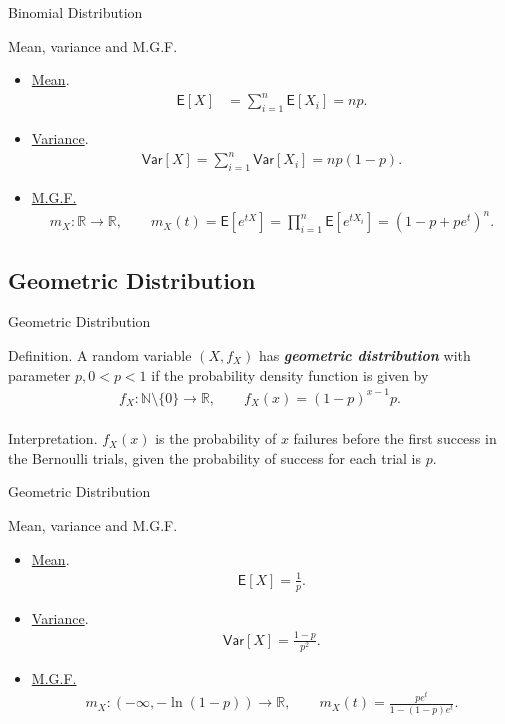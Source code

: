\documentclass[hyperref={pdfpagelabels=false}]{beamer}
\newcommand{\R}{\mathbb{R}}
\newcommand{\N}{\mathbb{N}}
\newcommand{\U}{\mathsf}
\newcommand{\highlightg}[1]{\textcolor[rgb]{0.1,0.5,0.3}{\emph{\textbf{#1}}}}
\newcommand{\structb}[1]{\textcolor[rgb]{0.2,0.2,0.7}{#1}}
\begin{document}
\begin{frame}{Binomial Distribution}

\justifying
\structb{Mean, variance and M.G.F.} 
\begin{itemize}
	\justifying
	\item \underline{Mean}.
	\begin{align*}
	\U{E}[X] & = \sum_{i=1}^n \U{E}[X_i] = np.
	\end{align*}
	\item \underline{Variance}. 
	\begin{align*}
	\U{Var}[X] = \sum_{i=1}^n\U{Var}[X_i] = np(1-p).
	\end{align*}
	\item \underline{M.G.F.}
	\begin{align*}
	m_X: \R\rightarrow\R, \qquad m_X(t) = \U{E}[e^{tX}] = \prod_{i=1}^n\U{E}[e^{tX_i}] = (1 - p + pe^t)^n.
	\end{align*}
\end{itemize}

\end{frame}

\subsection{Geometric Distribution}

\begin{frame}{Geometric Distribution}

\justifying
\structb{Definition.} A random variable $(X, f_X)$ has \highlightg{geometric distribution} with parameter $p, 0 < p < 1$ if the probability density function is given by
\begin{align*}
f_X: \N\setminus \{0\} \rightarrow \R, \qquad f_X(x) = (1-p)^{x-1} p.
\end{align*}
~\\
\structb{Interpretation.} $f_X(x)$ is the probability of $x$ failures before the first success in the Bernoulli trials, given the probability of success for each trial is $p$.

\end{frame}

\begin{frame}{Geometric Distribution}

\justifying
\structb{Mean, variance and M.G.F.} 
\begin{itemize}
	\justifying
	\item \underline{Mean}.
	\begin{align*}
	\U{E}[X] = \frac{1}{p}.
	\end{align*}
	\item \underline{Variance}.
	\begin{align*}
	\U{Var}[X] = \frac{1-p}{p^2}.
	\end{align*}
	\item \underline{M.G.F.}
	\begin{align*}
	m_X: (-\infty, -\ln(1-p)) \rightarrow\R, \qquad m_X(t) = \frac{pe^t}{1-(1-p)e^t}.
	\end{align*}
\end{itemize}

\end{frame}
%
\end{document}
